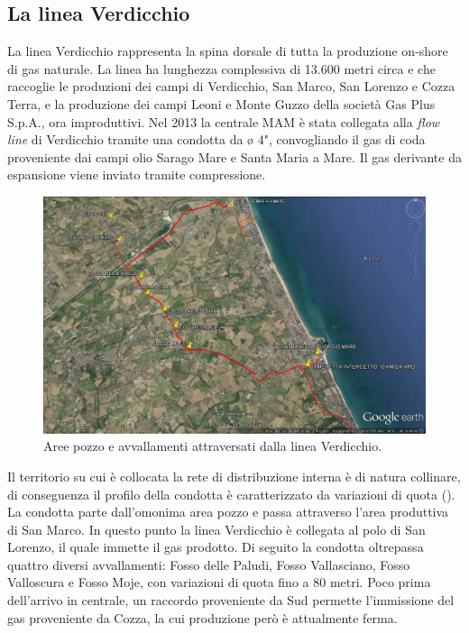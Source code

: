 \subsection{La linea Verdicchio}
La linea Verdicchio rappresenta la spina dorsale di tutta la produzione on-shore di gas naturale. La linea ha lunghezza complessiva di 13.600 metri circa e che raccoglie le produzioni dei campi di Verdicchio, San Marco, San Lorenzo e Cozza Terra, e la produzione dei campi Leoni e Monte Guzzo della società Gas Plus S.p.A., ora improduttivi.  Nel 2013 la centrale MAM è stata collegata alla \textit{flow line} di Verdicchio tramite una condotta da ø 4", convogliando il gas di coda proveniente dai campi olio Sarago Mare e Santa Maria a Mare. Il gas derivante da espansione viene inviato tramite compressione.\\

\begin{figure}[htbp]
	\centering
	\includegraphics[width=\textwidth]{fig/test/linea-verdicchio}
	\caption{Aree pozzo e avvallamenti attraversati dalla linea Verdicchio.}
	\label{fig:lineavrd}
\end{figure}

Il territorio su cui è collocata la rete di distribuzione interna è di natura collinare, di conseguenza il profilo della condotta è caratterizzato da variazioni di quota (). La condotta parte dall'omonima area pozzo e passa attraverso l'area produttiva di San Marco. In questo punto la linea Verdicchio è collegata al polo di San Lorenzo, il quale immette il gas prodotto. Di seguito la condotta oltrepassa quattro diversi avvallamenti: Fosso delle Paludi, Fosso Vallasciano, Fosso Valloscura e Fosso Moje, con variazioni di quota fino a 80 metri. Poco prima dell'arrivo in centrale, un raccordo proveniente da Sud permette l'immissione del gas proveniente da Cozza, la cui produzione però è attualmente ferma.

